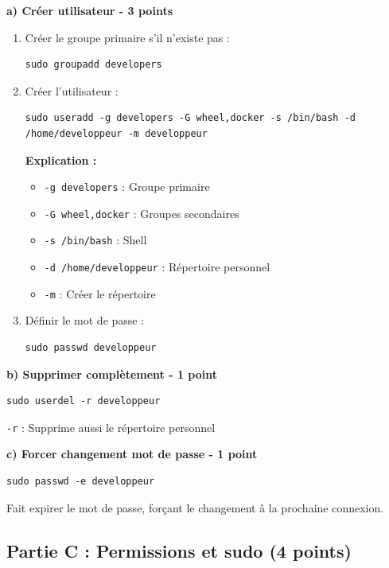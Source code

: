 \documentclass[12pt,a4paper]{article}
\begin{document}
\begin{answerbox}
\textbf{a) Créer utilisateur - 3 points}

\begin{enumerate}
    \item Créer le groupe primaire s'il n'existe pas :
    \begin{lstlisting}
sudo groupadd developers
    \end{lstlisting}
    
    \item Créer l'utilisateur :
    \begin{lstlisting}
sudo useradd -g developers -G wheel,docker -s /bin/bash -d /home/developpeur -m developpeur
    \end{lstlisting}
    
    \textbf{Explication :}
    \begin{itemize}
        \item \texttt{-g developers} : Groupe primaire
        \item \texttt{-G wheel,docker} : Groupes secondaires
        \item \texttt{-s /bin/bash} : Shell
        \item \texttt{-d /home/developpeur} : Répertoire personnel
        \item \texttt{-m} : Créer le répertoire
    \end{itemize}
    
    \item Définir le mot de passe :
    \begin{lstlisting}
sudo passwd developpeur
    \end{lstlisting}
\end{enumerate}

\textbf{b) Supprimer complètement - 1 point}
\begin{lstlisting}
sudo userdel -r developpeur
\end{lstlisting}
\texttt{-r} : Supprime aussi le répertoire personnel

\textbf{c) Forcer changement mot de passe - 1 point}
\begin{lstlisting}
sudo passwd -e developpeur
\end{lstlisting}
Fait expirer le mot de passe, forçant le changement à la prochaine connexion.
\end{answerbox}

\subsection*{Partie C : Permissions et sudo (4 points)}
\end{document}
